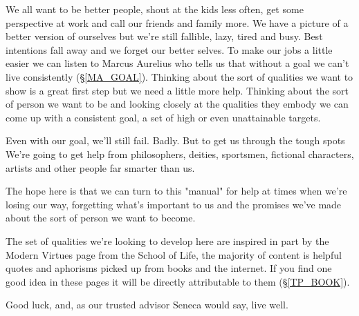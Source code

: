 
\cleardoublepage

\begin{multicols}{2}

We all want to be better people, shout at the kids less often, get some perspective at work and call our friends and family more. We have a picture of a better version of ourselves but we're still fallible, lazy, tired and busy. Best intentions fall away and we forget our better selves. 
To make our jobs a little easier we can listen to Marcus Aurelius who tells us that without a goal we can't live consistently (\S \ref{MA_GOAL}). Thinking about the sort of qualities we want to show is a great first step but we need a little more help. Thinking about the sort of person we want to be and looking closely at the qualities they embody we can come up with a consistent goal, a set of high or even unattainable targets. 

Even with our goal, we'll still fail. Badly. But to get us through the tough spots We're going to get help from philosophers, deities, sportsmen, fictional characters, artists and other people far smarter than us. 

The hope here is that we can turn to this "manual" for help at times when we're losing our way, forgetting what's important to us and the promises we've made about the sort of person we want to become.

The set of qualities we're looking to develop here are inspired in part by the Modern Virtues page from the School of Life, the majority of content is helpful quotes and aphorisms picked up from books and the internet. If you find one good idea in these pages it will be directly attributable to them (\S \ref{TP_BOOK}). 

Good luck, and, as our trusted advisor Seneca would say, live well.

\end{multicols}